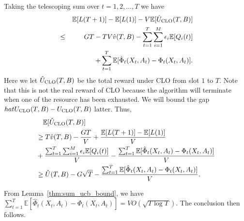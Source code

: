 {Taking the telescoping sum over $t = 1,  2, \ldots, T$ we have
\begin{eqnarray}
&&\mathbb{E}[L(T + 1)] - \mathbb{E}[L(1)] - V \mathbb{E}[\hat{U}_{\rm CLO}(T,B)] \nonumber \\
&\leq & GT - TV \hat{v}(T, B) -\sum_{t = 1}^T \sum_{i = 1}^M \epsilon_i  \mathbb{E}[Q_i(t)]  \nonumber \\
&& + \sum_{t = 1}^T \mathbb{E}[ \hat{\Phi}_t(X_t,A_t) - \Phi_t(X_t,A_t) ].
\end{eqnarray}
Here we let $\hat{U}_{\rm CLO}(T,B)$ be the total reward under CLO from slot $1$ to  $T$. Note that this is not the real reward of CLO because the algorithm will terminate when one of the resource has been exhausted. We will bound the gap $hat{U}_{\rm CLO}(T,B) - {U}_{\rm CLO}(T,B) $ latter.
Thus,
\begin{align}
&\quad \mathbb{E}[\hat{U}_{\rm CLO}(T,B)] \nonumber \\
&\geq T \hat{v}(T, B) - \frac{GT}{V} + \frac{\mathbb{E}[L(T + 1)] - \mathbb{E}[L(1)] }{V} \nonumber \\
& + \frac{\sum_{t = 1}^T \sum_{i = 1}^M \epsilon_i  \mathbb{E}[Q_i(t)]}{V} - \frac{\sum_{t = 1}^T \mathbb{E}[ \hat{\Phi}_t(X_t,A_t) - \Phi_t(X_t,A_t) ]}{V} \nonumber \\
& \geq  \hat{U}(T,B) - G\sqrt{T} - \frac{\sum_{t = 1}^T \mathbb{E}[ \hat{\Phi}_t(X_t,A_t) - \Phi_t(X_t,A_t) ]}{V}.
\end{align}

From Lemma~\ref{thm:sum_ucb_bound}, we have $\sum_{t = 1}^T \mathbb{E}[ \hat{\Phi}_t(X_t,A_t) - \Phi_t(X_t,A_t) ] = V O(\sqrt{T\log T})$.
The conclusion then follows.
}

